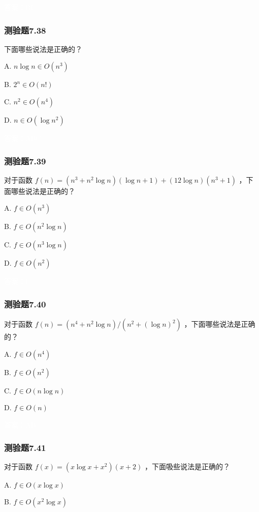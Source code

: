 \documentclass[UTF8, heading=true]{ctexart}
\begin{document}
\textcolor{white}{答案：BC}

\subsubsection{测验题7.38}

下面哪些说法是正确的？

A. $ n \log n \in O\left(n^3\right)$

B. $2^n \in O(n!)$

C. $n^2 \in O\left(n^4\right)$

D. $ n \in O\left(\log n^2\right)$

\textcolor{white}{答案：ABC}


\subsubsection{测验题7.39}

对于函数 $f(n)=\left(n^3+n^2 \log n\right)(\log n+1)+(12 \log n)\left(n^3+1\right)$ ，下面哪些说法是正确的？

A. $f \in O\left(n^3\right)$

B. $f \in O\left(n^2 \log n\right)$

C. $f \in O\left(n^3 \log n\right)$

D.  $f \in O\left(n^2\right)$


\textcolor{white}{答案：C}

\subsubsection{测验题7.40}

对于函数 $f(n)=\left(n^4+n^2 \log n\right) /\left(n^2+(\log n)^2\right)$ ，下面哪些说法是正确的？

A. $ f \in O\left(n^4\right)$

B. $ f \in O\left(n^2\right)$

C. $ f \in O(n \log n)$

D. $f \in O(n)$

\textcolor{white}{答案：AB}


\subsubsection{测验题7.41}

对于函数 $f(x)=\left(x \log x+x^2\right)(x+2)$ ，下面吸些说法是正确的？

A. $ f \in O(x \log x)$

B. $f \in O\left(x^2 \log x\right)$
\end{document}
